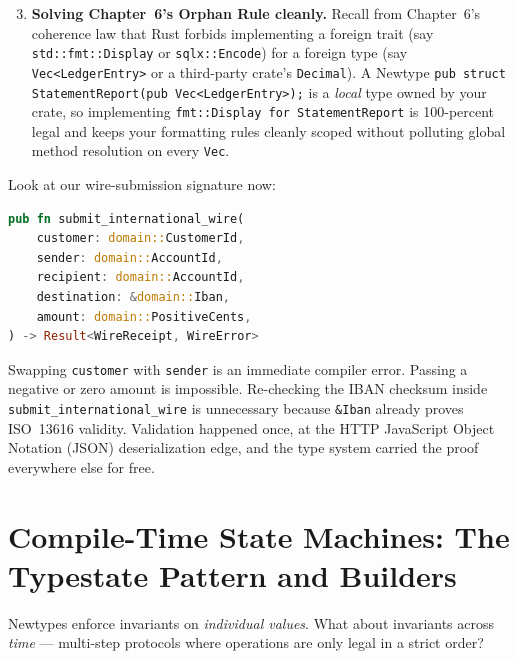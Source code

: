 \begin{enumerate}\setcounter{enumi}{2}
  \item \textbf{Solving Chapter~6's Orphan Rule cleanly.} Recall from Chapter~6's coherence law that Rust forbids implementing a foreign trait (say \texttt{std::fmt::Display} or \texttt{sqlx::Encode}) for a foreign type (say \texttt{Vec<LedgerEntry>} or a third-party crate's \texttt{Decimal}). A Newtype \texttt{pub struct StatementReport(pub Vec<LedgerEntry>);} is a \emph{local} type owned by your crate, so implementing \texttt{fmt::Display for StatementReport} is 100-percent legal and keeps your formatting rules cleanly scoped without polluting global method resolution on every \texttt{Vec}.
\end{enumerate}

Look at our wire-submission signature now:

\begin{lstlisting}[language=Rust]
pub fn submit_international_wire(
    customer: domain::CustomerId,
    sender: domain::AccountId,
    recipient: domain::AccountId,
    destination: &domain::Iban,
    amount: domain::PositiveCents,
) -> Result<WireReceipt, WireError>
\end{lstlisting}

Swapping \texttt{customer} with \texttt{sender} is an immediate compiler error. Passing a negative or zero amount is impossible. Re-checking the IBAN checksum inside \texttt{submit\_international\_wire} is unnecessary because \texttt{\&Iban} already proves ISO~13616 validity. Validation happened once, at the HTTP JavaScript Object Notation (JSON) deserialization edge, and the type system carried the proof everywhere else for free.

\section{Compile-Time State Machines: The Typestate Pattern and Builders}
\label{ch08:typestate-and-builders}

Newtypes enforce invariants on \emph{individual values}. What about invariants across \emph{time} --- multi-step protocols where operations are only legal in a strict order?


